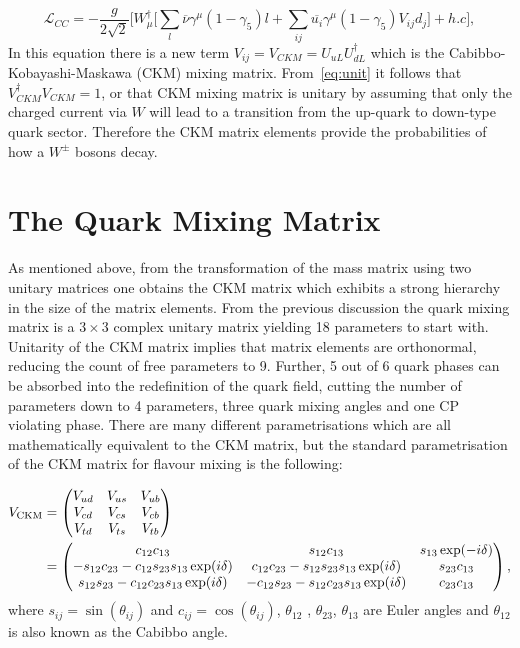 \begin{equation}
	\mathcal{L}_{CC}= - \frac{g}{2\sqrt{2}}\Big[W^{\dagger}_{\mu}\big[\sum_{l}\overline{\nu}\gamma^{\mu}(1-\gamma_{5})l + \sum_{ij}\overline{u_{i}}\gamma^{\mu}(1-\gamma_{5})V_{ij}d_{j}\big] + h.c\Big], 
\label{eq:LC}
\end{equation}
In this equation there is a new term $V_{ij}=V_{CKM}= U_{uL} U_{dL}^\dag$ which is the Cabibbo-Kobayashi-Maskawa (CKM) mixing matrix. From~\autoref{eq:unit} it follows that $V^{\dagger}_{CKM}V_{CKM}=1$, or that \gls{CKM} mixing matrix is unitary by assuming that only the charged current via $W$ will lead to a transition from the up-quark to down-type quark sector. Therefore the CKM matrix elements provide the probabilities of how a $W^{\pm}$ bosons decay.
 





\section{The Quark Mixing Matrix}
\label{ckm}
As mentioned above, from the transformation of the mass matrix using two unitary matrices one obtains the \gls{CKM} matrix which exhibits a strong hierarchy in the size of the matrix elements. From the previous discussion the quark mixing matrix is a $3 \times 3$ complex unitary matrix yielding 18 parameters to start with. Unitarity of the \gls{CKM} matrix implies that matrix elements are orthonormal, reducing the count of free parameters to 9. Further, 5 out of 6 quark phases can be absorbed into the redefinition of the quark field, cutting the number of parameters down to 4 parameters, three quark mixing angles and one CP violating phase. There are many different parametrisations which are all mathematically equivalent to the \gls{CKM} matrix, but the standard parametrisation of the \gls{CKM} matrix for flavour mixing is the following:

\begin{align}
V_{\rm CKM} &=  \begin{pmatrix}   V_{ud} & V_{us} & V_{ub} \cr
    V_{cd} & V_{cs} & V_{cb} \cr
    V_{td} & V_{ts} & V_{tb} \cr \end{pmatrix} \\
 &= \begin{pmatrix}c_{12}c_{13}& s_{12}c_{13} & s_{13}\exp(-i\delta) \cr
-s_{12}c_{23}-c_{12}s_{23}s_{13}\exp(i\delta) & c_{12}c_{23}- 
s_{12}s_{23}s_{13}\exp(i\delta) & s_{23}c_{13} \cr 
s_{12}s_{23}- c_{12}c_{23}s_{13}\exp(i\delta) & 
-c_{12}s_{23}-s_{12}c_{23}s_{13}\exp(i\delta) & c_{23}c_{13}\end{pmatrix},
\end{align}
where $s_{ij} = \sin(\theta_{ij})$ and $c_{ij} = \cos(\theta_{ij})$, $\theta_{12}$ , $\theta_{23}$, $\theta_{13}$ are Euler angles and $\theta_{12}$ is also known as the Cabibbo angle.

